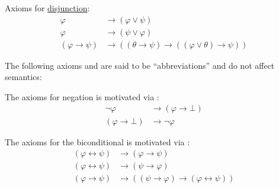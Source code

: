 \begin{definition}
\begin{thmenum}[series=def:minimal_propositional_axiomatic_derivation_system]
     Axioms for \hyperref[def:propositional_language/connectives/disjunction]{disjunction}:
    \begin{align}
      \varphi                    &\rightarrow (\varphi \vee \psi) \label{def:minimal_propositional_axiomatic_derivation_system/or_elim_left} \\
      \varphi                    &\rightarrow (\psi \vee \varphi) \label{def:minimal_propositional_axiomatic_derivation_system/or_elim_right} \\
      (\varphi \rightarrow \psi) &\rightarrow ((\theta \rightarrow \psi) \rightarrow ((\varphi \vee \theta) \rightarrow \psi)) \label{def:minimal_propositional_axiomatic_derivation_system/or_intro}
    \end{align}
  \end{thmenum}

  The following axioms and are said to be \enquote{abbreviations} and do not affect semantics:
  \begin{thmenum}[resume=def:minimal_propositional_axiomatic_derivation_system]
     The axioms for negation is motivated via :
    \begin{align}
      \neg \varphi &\rightarrow (\varphi \rightarrow \bot) \label{def:minimal_propositional_axiomatic_derivation_system/neg_elim} \\
      (\varphi \rightarrow \bot) &\rightarrow \neg \varphi \label{def:minimal_propositional_axiomatic_derivation_system/neg_intro}
    \end{align}

     The axioms for the biconditional is motivated via :
    \begin{align}
      (\varphi \leftrightarrow \psi) &\rightarrow (\varphi \rightarrow \psi) \label{def:minimal_propositional_axiomatic_derivation_system/equiv_elim_left} \\
      (\varphi \leftrightarrow \psi) &\rightarrow (\psi \rightarrow \varphi) \label{def:minimal_propositional_axiomatic_derivation_system/equiv_elim_right} \\
      (\varphi \rightarrow \psi)     &\rightarrow ((\psi \rightarrow \varphi) \rightarrow (\varphi \leftrightarrow \psi)) \label{def:minimal_propositional_axiomatic_derivation_system/equiv_intro}
    \end{align}
  \end{thmenum}
\end{definition}

